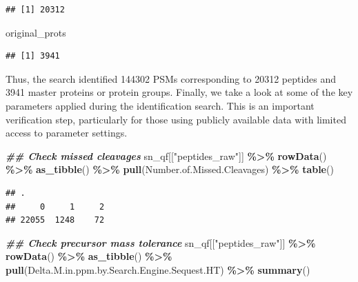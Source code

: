 \documentclass[9pt,a4paper,]{extarticle}
\newenvironment{Shaded}{\begin{snugshade}}{\end{snugshade}}
\newcommand{\DocumentationTok}[1]{\textcolor[rgb]{0.56,0.35,0.01}{\textbf{\textit{#1}}}}
\newcommand{\FunctionTok}[1]{\textcolor[rgb]{0.13,0.29,0.53}{\textbf{#1}}}
\newcommand{\NormalTok}[1]{#1}
\newcommand{\SpecialCharTok}[1]{\textcolor[rgb]{0.81,0.36,0.00}{\textbf{#1}}}
\newcommand{\StringTok}[1]{\textcolor[rgb]{0.31,0.60,0.02}{#1}}
\begin{document}
\begin{verbatim}
## [1] 20312
\end{verbatim}

\begin{Shaded}
\begin{Highlighting}[]
\NormalTok{original\_prots}
\end{Highlighting}
\end{Shaded}

\begin{verbatim}
## [1] 3941
\end{verbatim}

Thus, the search identified 144302 PSMs
corresponding to 20312 peptides and
3941 master proteins or protein groups. Finally, we take a look at
some of the key parameters applied during the identification search. This is an
important verification step, particularly for those using publicly available
data with limited access to parameter settings.

\begin{Shaded}
\begin{Highlighting}[]
\DocumentationTok{\#\# Check missed cleavages}
\NormalTok{sn\_qf[[}\StringTok{"peptides\_raw"}\NormalTok{]] }\SpecialCharTok{\%\textgreater{}\%}
  \FunctionTok{rowData}\NormalTok{() }\SpecialCharTok{\%\textgreater{}\%} 
  \FunctionTok{as\_tibble}\NormalTok{() }\SpecialCharTok{\%\textgreater{}\%} 
  \FunctionTok{pull}\NormalTok{(Number.of.Missed.Cleavages) }\SpecialCharTok{\%\textgreater{}\%} 
  \FunctionTok{table}\NormalTok{()}
\end{Highlighting}
\end{Shaded}

\begin{verbatim}
## .
##     0     1     2 
## 22055  1248    72
\end{verbatim}

\begin{Shaded}
\begin{Highlighting}[]
\DocumentationTok{\#\# Check precursor mass tolerance}
\NormalTok{sn\_qf[[}\StringTok{"peptides\_raw"}\NormalTok{]] }\SpecialCharTok{\%\textgreater{}\%}
  \FunctionTok{rowData}\NormalTok{() }\SpecialCharTok{\%\textgreater{}\%} 
  \FunctionTok{as\_tibble}\NormalTok{() }\SpecialCharTok{\%\textgreater{}\%} 
  \FunctionTok{pull}\NormalTok{(Delta.M.in.ppm.by.Search.Engine.Sequest.HT) }\SpecialCharTok{\%\textgreater{}\%} 
  \FunctionTok{summary}\NormalTok{()}
\end{Highlighting}
\end{Shaded}
\end{document}
